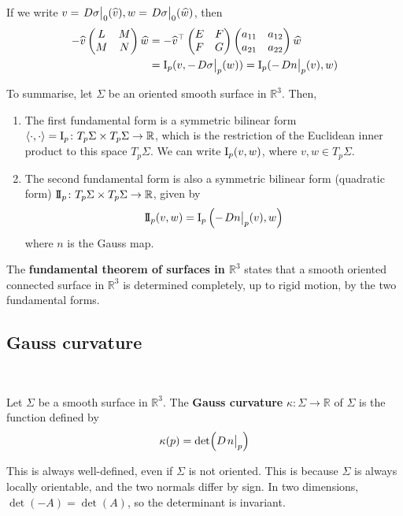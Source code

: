 \documentclass[a4paper]{article}
\begin{document}
If we write $ v = \teval{D\sigma}0 (\widehat{v}) ,w = \teval{D\sigma}0 (\widehat{w})$, then 
\begin{align*}
	- \widehat{v} \begin{pmatrix}
		L  &  M \\
		M &  N \\
	\end{pmatrix} \widehat{w} &= - \widehat{v}^\top \begin{pmatrix}
		E &  F \\
		F &  G \\
	\end{pmatrix} \begin{pmatrix}
		a_{11} &  a_{12} \\
		a_{21} &  a_{22} \\
	\end{pmatrix} \widehat{w}\\ 
	&= \Iff_p (v,-\teval{D\sigma}p (w) ) = \Iff_p(-\teval{Dn}p(v),w)
\end{align*}

To summarise, let \( \Sigma \) be an oriented smooth surface in \( \mathbb R^3 \).
Then,
\begin{enumerate}
	\item The first fundamental form is a symmetric bilinear form \( \left\langle{\cdot,\cdot}\right\rangle = \operatorname{\mathrm{I}}_p \colon T_p \Sigma \times T_p \Sigma \to \mathbb R \), which is the restriction of the Euclidean inner product to this space \( T_p \Sigma \).
			We can write \( \operatorname{\mathrm{I}}_p(v,w) \), where \( v, w \in T_p \Sigma \).
	\item The second fundamental form is also a symmetric bilinear form (quadratic form) \( \operatorname{\mathrm{I\!I}}_p \colon T_p \Sigma \times T_p \Sigma \to \mathbb R \), given by
			\[
				\IIff_p(v,w) = \Iff_p\qty(-\teval{Dn}{p}(v), w)
			\]
			where \( n \) is the Gauss map.
\end{enumerate}

\begin{remark}
	The \textbf{fundamental theorem of surfaces in \( \mathbb R^3 \)} states that a smooth oriented connected surface in \( \mathbb R^3 \) is determined completely, up to rigid motion, by the two fundamental forms.
\end{remark}

\subsection{Gauss curvature}
\ \vspace*{-1.5em}
\begin{definition}
	Let \( \Sigma \) be a smooth surface in \( \mathbb R^3 \).
	The \textbf{Gauss curvature} \( \kappa \colon \Sigma \to \mathbb R \) of \( \Sigma \) is the function defined by
	\[
		\kappa(p) = \det(D \teval{n}p)
	\]
\end{definition}
\begin{remark}
	This is always well-defined, even if \( \Sigma \) is not oriented.
	This is because \( \Sigma \) is always locally orientable, and the two normals differ by sign.
	In two dimensions, \( \det(-A) = \det(A) \), so the determinant is invariant.
\end{remark}
\end{document}
